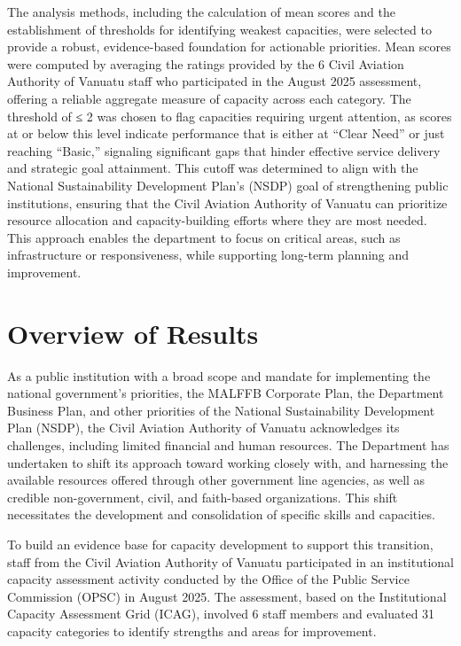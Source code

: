 \documentclass[
  10pt,
]{report}
\begin{document}
The analysis methods, including the calculation of mean scores and the
establishment of thresholds for identifying weakest capacities, were
selected to provide a robust, evidence-based foundation for actionable
priorities. Mean scores were computed by averaging the ratings provided
by the 6 Civil Aviation Authority of Vanuatu staff who participated in
the August 2025 assessment, offering a reliable aggregate measure of
capacity across each category. The threshold of ≤ 2 was chosen to flag
capacities requiring urgent attention, as scores at or below this level
indicate performance that is either at ``Clear Need'' or just reaching
``Basic,'' signaling significant gaps that hinder effective service
delivery and strategic goal attainment. This cutoff was determined to
align with the National Sustainability Development Plan's (NSDP) goal of
strengthening public institutions, ensuring that the Civil Aviation
Authority of Vanuatu can prioritize resource allocation and
capacity-building efforts where they are most needed. This approach
enables the department to focus on critical areas, such as
infrastructure or responsiveness, while supporting long-term planning
and improvement.

\section{Overview of Results}\label{overview-of-results}

As a public institution with a broad scope and mandate for implementing
the national government's priorities, the MALFFB Corporate Plan, the
Department Business Plan, and other priorities of the National
Sustainability Development Plan (NSDP), the Civil Aviation Authority of
Vanuatu acknowledges its challenges, including limited financial and
human resources. The Department has undertaken to shift its approach
toward working closely with, and harnessing the available resources
offered through other government line agencies, as well as credible
non-government, civil, and faith-based organizations. This shift
necessitates the development and consolidation of specific skills and
capacities.

To build an evidence base for capacity development to support this
transition, staff from the Civil Aviation Authority of Vanuatu
participated in an institutional capacity assessment activity conducted
by the Office of the Public Service Commission (OPSC) in August 2025.
The assessment, based on the Institutional Capacity Assessment Grid
(ICAG), involved 6 staff members and evaluated 31 capacity categories to
identify strengths and areas for improvement.
\end{document}
